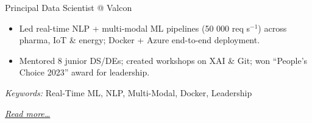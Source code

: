 \large{Principal Data Scientist @ Valcon}

\normalsize
\begin{itemize}  
    \item Led real-time NLP + multi-modal ML pipelines (50 000 req s$^{-1}$) across pharma, IoT \& energy; Docker + Azure end-to-end deployment.
    \item Mentored 8 junior DS/DEs; created workshops on XAI \& Git; won “People's Choice 2023” award for leadership.
\end{itemize}

\small{\textit{Keywords:} Real-Time ML, NLP, Multi-Modal, Docker, Leadership}

\hfill{\small{\textit{\hyperref[sec:signum]{Read more…}}}}

